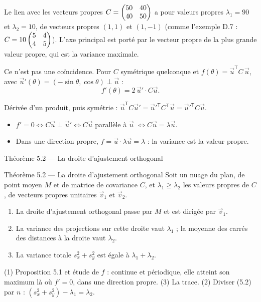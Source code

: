 \begin{frame}{Le lien avec les vecteurs propres}
  \small $C=\begin{pmatrix}50 & 40\\ 40 & 50\end{pmatrix}$ a pour valeurs propres $\lambda_1=90$ et
  $\lambda_2=10$, de vecteurs propres $(1,1)$ et $(1,-1)$ (comme
  l'exemple D.7 : $C=10\begin{pmatrix}5 & 4\\ 4 & 5\end{pmatrix}$). L'axe principal est porté par le
  vecteur propre de la plus grande valeur propre, qui est la variance
  maximale.
  \vspace{4pt}

  Ce n'est pas une coïncidence. Pour $C$ symétrique quelconque et
  $f(\theta)=\vec u^{\mathsf T}C\,\vec u$, avec
  $\vec u'(\theta)=(-\sin\theta,\cos\theta)\perp\vec u$ :
  \[
    f'(\theta)=2\,\vec u'\cdot C\vec u .
  \]
  \begin{AuTableau}
    \footnotesize Dérivée d'un produit, puis symétrie :
    $\vec u^{\mathsf T}C\vec u'=\vec u'^{\mathsf T}C^{\mathsf T}\vec u=\vec u'^{\mathsf T}C\vec u$.
  \end{AuTableau}
  \begin{itemize}
    \item $f'=0\iff C\vec u\perp\vec u'\iff C\vec u$ parallèle à $\vec u$
      $\iff C\vec u=\lambda\vec u$.
    \item Dans une direction propre, $f=\vec u\cdot\lambda\vec u=\lambda$ :
      la variance est la valeur propre.
  \end{itemize}
\end{frame}

\begin{frame}{Théorème 5.2 --- La droite d'ajustement orthogonal}
  \begin{Enonce}{Théorème 5.2 --- La droite d'ajustement orthogonal}
    Soit un nuage du plan, de point moyen $M$ et de matrice de covariance
    $C$, et $\lambda_1\geq\lambda_2$ les valeurs propres de $C$, de vecteurs
    propres unitaires $\vec v_1$ et $\vec v_2$.
    \begin{enumerate}
      \item La droite d'ajustement orthogonal passe par $M$ et est dirigée
        par $\vec v_1$.
      \item La variance des projections sur cette droite vaut $\lambda_1$ ;
        la moyenne des carrés des distances à la droite vaut $\lambda_2$.
      \item La variance totale $s_x^2+s_y^2$ est égale à
        $\lambda_1+\lambda_2$.
    \end{enumerate}
  \end{Enonce}
  \begin{AuTableau}
    \footnotesize (1) Proposition 5.1 et étude de $f$ : continue et
    périodique, elle atteint son maximum là où $f'=0$, dans une direction
    propre. (3) La trace. (2) Diviser (5.2) par $n$ :
    $(s_x^2+s_y^2)-\lambda_1=\lambda_2$.
  \end{AuTableau}
\end{frame}

